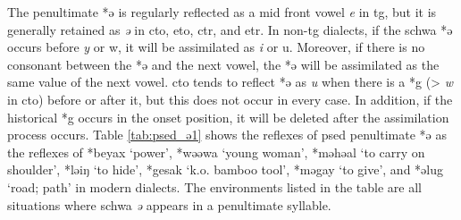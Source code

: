 The penultimate *ə is regularly reflected as a mid front vowel \textit{e} in \acl{tg}, but it is  generally retained as \textit{ə} in \acl{cto}, \acl{eto}, \acl{ctr}, and \acl{etr}. In non-\acl{tg} dialects, if the schwa *ə occurs before \textit{y} or {w}, it will be assimilated as \textit{i} or {u}. Moreover, if there is no consonant between the *ə and the next vowel, the *ə will be assimilated as the same value of the next vowel. \acl{cto}  tends to reflect *ə as \textit{u} when there is a *g (> \textit{w} in \acl{cto}) before or after it, but this does not occur in every case. In addition, if the historical *g occurs in the onset position, it will be deleted after the assimilation process occurs. Table \ref{tab:psed_ə1} shows the reflexes of \acl{psed} penultimate *ə as the reflexes of *beyax `power', *wəəwa `young woman', *məhəal `to carry on shoulder', *ləiŋ `to hide', *gesak `k.o. bamboo tool', *məgay `to give', and *əlug `road; path' in modern dialects. The environments listed in the table are all situations where schwa \textit{ə} appears in a penultimate syllable.

